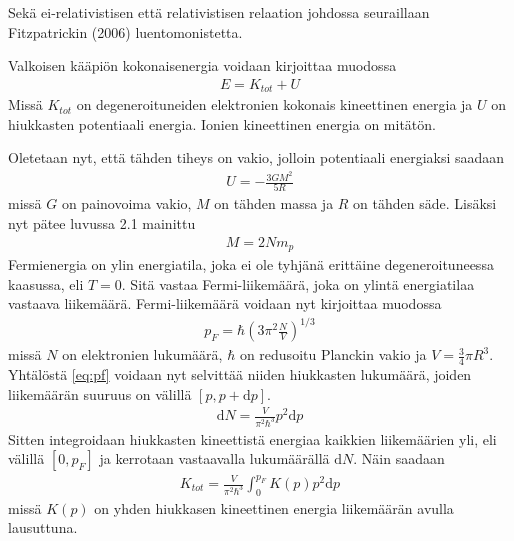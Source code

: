 \documentclass[12pt,a4paper,titlepage]{article}
\begin{document}
Sekä ei-relativistisen että relativistisen relaation johdossa seuraillaan Fitzpatrickin (2006) luentomonistetta. 

Valkoisen kääpiön kokonaisenergia voidaan kirjoittaa muodossa
\begin{align}
E = K_{tot} + U \label{eq:e}
\end{align}
Missä $K_{tot}$ on degeneroituneiden elektronien kokonais kineettinen energia ja $U$ on hiukkasten potentiaali energia. Ionien kineettinen energia on mitätön. 

Oletetaan nyt, että tähden tiheys on vakio, jolloin potentiaali energiaksi saadaan 
\begin{align}
U = -\frac{3 G M ^2}{5 R} \label{eq:u}
\end{align}
missä $G$ on painovoima vakio, $M$ on tähden massa ja $R$ on tähden säde. Lisäksi nyt pätee luvussa 2.1 mainittu 
\begin{align}
M = 2 N m_p \label{eq:m}
\end{align}
Fermienergia on ylin energiatila, joka ei ole tyhjänä erittäine degeneroituneessa kaasussa, eli $T = 0$. Sitä vastaa Fermi-liikemäärä, joka on ylintä energiatilaa vastaava liikemäärä. Fermi-liikemäärä voidaan nyt kirjoittaa muodossa
\begin{align}
p_F = \hbar \left( 3 \pi^2 \frac{N}{V} \right)^{1/3} \label{eq:pf}
\end{align}
missä $N$ on elektronien lukumäärä, $\hbar$ on redusoitu Planckin vakio ja $V = \frac{3}{4} \pi R^3$. Yhtälöstä \eqref{eq:pf} voidaan nyt selvittää niiden hiukkasten lukumäärä, joiden liikemäärän suuruus on välillä $[p, p+\mathrm{d}p]$.
\begin{align}
\mathrm{d}N = \frac{V}{\pi^2 \hbar^3} p^2 \mathrm{d}p
\end{align}
Sitten integroidaan hiukkasten kineettistä energiaa kaikkien liikemäärien yli, eli välillä $[0, p_F]$ ja kerrotaan vastaavalla lukumäärällä $\mathrm{d}N$. Näin saadaan
\begin{align}
K_{tot} = \frac{V}{\pi^2 \hbar^3} \int_0^{p_F} K(p) p^2 \mathrm{d}p \label{eq:k}
\end{align}
missä $K(p)$ on yhden hiukkasen kineettinen energia liikemäärän avulla lausuttuna.
\end{document}
